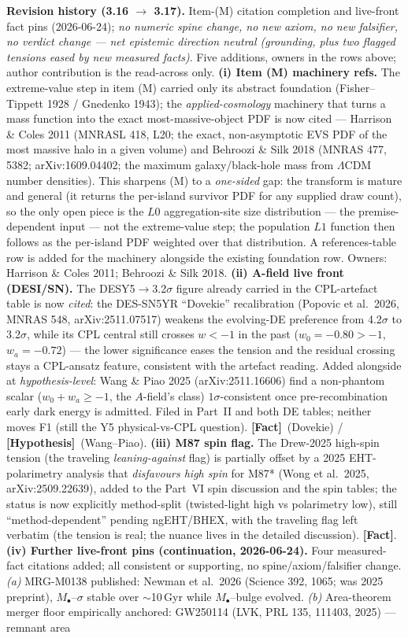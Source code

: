 \documentclass[11pt]{article}
\newcommand{\fact}{\textcolor{green!40!black}{\textbf{[Fact]}}}
\newcommand{\hyp}{\textcolor{orange!80!black}{\textbf{[Hypothesis]}}}
\begin{document}
\smallskip\noindent\textbf{Revision history (3.16 $\to$ 3.17).} Item-(M) citation completion and live-front fact pins (2026-06-24); \emph{no numeric spine change, no new axiom, no new falsifier, no verdict change --- net epistemic direction neutral (grounding, plus two flagged tensions eased by new measured facts)}. Five additions, owners in the rows above; author contribution is the read-across only. \textbf{(i) Item (M) machinery refs.} The extreme-value step in item (M) carried only its abstract foundation (Fisher--Tippett 1928 / Gnedenko 1943); the \emph{applied-cosmology} machinery that turns a mass function into the exact most-massive-object PDF is now cited --- Harrison \& Coles 2011 (MNRASL 418, L20; the exact, non-asymptotic EVS PDF of the most massive halo in a given volume) and Behroozi \& Silk 2018 (MNRAS 477, 5382; arXiv:1609.04402; the maximum galaxy/black-hole mass from $\Lambda$CDM number densities). This sharpens (M) to a \emph{one-sided} gap: the transform is mature and general (it returns the per-island survivor PDF for any supplied draw count), so the only open piece is the $L0$ aggregation-site size distribution --- the premise-dependent input --- not the extreme-value step; the population $L1$ function then follows as the per-island PDF weighted over that distribution. A references-table row is added for the machinery alongside the existing foundation row. Owners: Harrison \& Coles 2011; Behroozi \& Silk 2018. \textbf{(ii) A-field live front (DESI/SN).} The DESY5$\to$3.2$\sigma$ figure already carried in the CPL-artefact table is now \emph{cited}: the DES-SN5YR ``Dovekie'' recalibration (Popovic et al.\ 2026, MNRAS 548, arXiv:2511.07517) weakens the evolving-DE preference from 4.2$\sigma$ to 3.2$\sigma$, while its CPL central still crosses $w<-1$ in the past ($w_0=-0.80>-1$, $w_a=-0.72$) --- the lower significance eases the tension and the residual crossing stays a CPL-ansatz feature, consistent with the artefact reading. Added alongside at \emph{hypothesis-level}: Wang \& Piao 2025 (arXiv:2511.16606) find a non-phantom scalar ($w_0+w_a\ge-1$, the $A$-field's class) $1\sigma$-consistent once pre-recombination early dark energy is admitted. Filed in Part~II and both DE tables; neither moves F1 (still the Y5 physical-vs-CPL question). \fact\ (Dovekie) / \hyp\ (Wang--Piao). \textbf{(iii) M87 spin flag.} The Drew-2025 high-spin tension (the traveling \emph{leaning-against} flag) is partially offset by a 2025 EHT-polarimetry analysis that \emph{disfavours high spin} for M87* (Wong et al.\ 2025, arXiv:2509.22639), added to the Part~VI spin discussion and the spin tables; the status is now explicitly method-split (twisted-light high vs polarimetry low), still ``method-dependent'' pending ngEHT/BHEX, with the traveling flag left verbatim (the tension is real; the nuance lives in the detailed discussion). \fact. \textbf{(iv) Further live-front pins (continuation, 2026-06-24).} Four measured-fact citations added; all consistent or supporting, no spine/axiom/falsifier change. \emph{(a)} MRG-M0138 published: Newman et al.\ 2026 (Science 392, 1065; was 2025 preprint), $M_\bullet$--$\sigma$ stable over $\sim$10\,Gyr while $M_\bullet$--bulge evolved. \emph{(b)} Area-theorem merger floor empirically anchored: GW250114 (LVK, PRL 135, 111403, 2025) --- remnant area 
\end{document}
